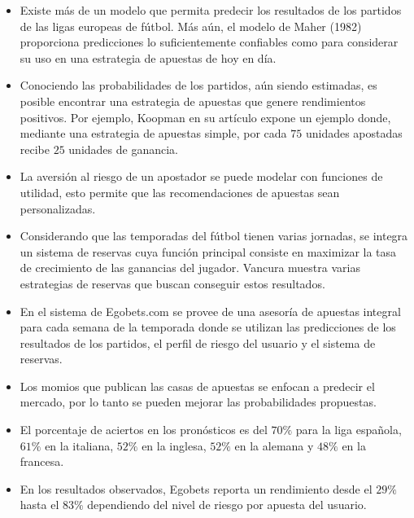 \begin{itemize}


	\item Existe más de un modelo que permita predecir los resultados de los partidos de las ligas europeas de fútbol. Más aún, el modelo de Maher (1982)\cite{maher1982modelling} proporciona predicciones lo suficientemente confiables como para considerar su uso en una estrategia de apuestas de hoy en día.

	\item Conociendo las probabilidades de los partidos, aún siendo estimadas, es posible encontrar una estrategia de apuestas que genere rendimientos positivos. Por ejemplo, Koopman en su artículo \cite{koopman2013dynamic} expone un ejemplo donde, mediante una estrategia de apuestas simple, por cada $75$ unidades apostadas recibe $25$ unidades de ganancia.

	\item La aversión al riesgo de un apostador se puede modelar con funciones de utilidad, esto permite que las recomendaciones de apuestas sean personalizadas. 
	
	\item Considerando que las temporadas del fútbol tienen varias jornadas, se integra un sistema de reservas cuya función principal consiste en maximizar la tasa de crecimiento de las ganancias del jugador. Vancura \cite{vancura2000finding} muestra varias estrategias de reservas que buscan conseguir estos resultados.

\item En el sistema de Egobets.com se provee de una asesoría de apuestas integral para cada semana de la temporada donde se utilizan las predicciones de los resultados de los partidos, el perfil de riesgo del usuario y el sistema de reservas.

\item Los momios que publican las casas de apuestas se enfocan a predecir el mercado, por lo tanto se pueden mejorar las probabilidades propuestas.

\item  El porcentaje de aciertos en los pronósticos es del $70\%$ para la liga española, $61\%$ en la italiana, $52\%$ en la inglesa, $52\%$ en la alemana y $48\%$ en la francesa.

\item En los resultados observados, Egobets reporta un rendimiento desde el $29\%$ hasta el $83\%$ dependiendo del nivel de riesgo por apuesta del usuario.


\end{itemize}
